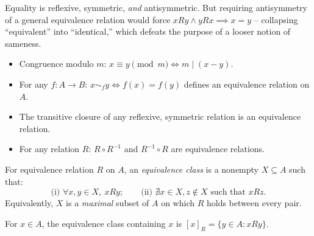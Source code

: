 \documentclass[11pt]{article}
\begin{document}
\begin{note}
Equality is reflexive, symmetric, \emph{and} antisymmetric. But requiring antisymmetry of a general equivalence relation would force $xRy \wedge yRx \implies x=y$ -- collapsing ``equivalent'' into ``identical,'' which defeats the purpose of a looser notion of sameness.
\end{note}

\begin{example}
\begin{itemize}
    \item Congruence modulo $m$: $x \equiv y \pmod{m} \iff m \mid (x-y)$.
    \item For any $f: A \to B$: $x \sim_f y \iff f(x)=f(y)$ defines an equivalence relation on $A$.
    \item The transitive closure of any reflexive, symmetric relation is an equivalence relation.
    \item For any relation $R$: $R \circ R^{-1}$ and $R^{-1} \circ R$ are equivalence relations.
\end{itemize}
\end{example}

\begin{definition}
For equivalence relation $R$ on $A$, an \emph{equivalence class} is a nonempty $X \subseteq A$ such that:
\[
\text{(i) } \forall x,y \in X,\ xRy; \qquad \text{(ii) } \nexists x \in X, z \notin X \text{ such that } xRz.
\]
Equivalently, $X$ is a \emph{maximal} subset of $A$ on which $R$ holds between every pair.
\end{definition}

\begin{note}
For $x \in A$, the equivalence class containing $x$ is $[x]_R = \{y \in A : xRy\}$.
\end{note}
\end{document}
